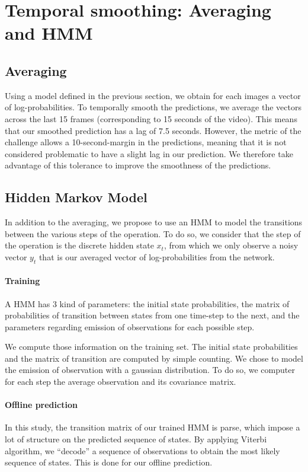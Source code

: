 \documentclass[10pt,twocolumn,letterpaper]{article}
\begin{document}
\section{Temporal smoothing: Averaging and HMM}

\subsection{Averaging}

Using a model defined in the previous section, we obtain for each images a vector of log-probabilities.
To temporally smooth the predictions, we average the vectors across the
last 15 frames (corresponding to 15 seconds of the video). This means that our
smoothed prediction has a lag of 7.5 seconds. However, the metric of the challenge
allows a 10-second-margin in the predictions, meaning that it is not considered
problematic to have a slight lag in our prediction. We therefore take advantage
of this tolerance to improve the smoothness of the predictions.

\subsection{Hidden Markov Model}

In addition to the averaging, we propose to use an HMM to model the transitions
between the various steps of the operation. To do so, we consider that the step of the operation is the discrete hidden state $x_t$,
from which we only observe a noisy vector $y_t$ that is our averaged vector of log-probabilities from
the network.

\paragraph{Training} A HMM has 3 kind of parameters: the initial state probabilities, the matrix of probabilities
of transition between states from one time-step to the next, and the parameters
regarding emission of observations for each possible step.

We compute those information on the training set. The initial state probabilities and the matrix of transition are computed by simple counting. We chose to model the emission of
observation with a gaussian distribution. To do so, we computer for each step the average observation and its covariance matrix.

\paragraph{Offline prediction} In this study, the transition matrix of our trained HMM is parse, which impose a lot of structure on the predicted sequence of states. By applying Viterbi algorithm, we ``decode'' a sequence of observations to obtain the most likely sequence of states. This is done for our offline prediction.
\end{document}
